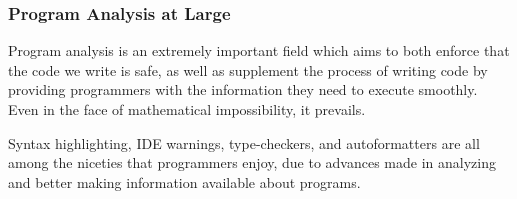 \documentclass[aspectratio=169, handout]{beamer}
\begin{document}
 \begin{frame}[fragile]
   \frametitle{Program Analysis at Large}

   Program analysis is an extremely important field which aims to both
   enforce that the code we write is safe, as well as supplement the process
   of writing code by providing programmers with the information they need to
   execute smoothly. Even in the face of mathematical impossibility, it
   prevails.

   \pause
   \vspace{\fill}

   Syntax highlighting, IDE warnings, type-checkers, and autoformatters are all
   among the niceties that programmers enjoy, due to advances made in analyzing
   and better making information available about programs.
 \end{frame}

\thankyou
\end{document}
